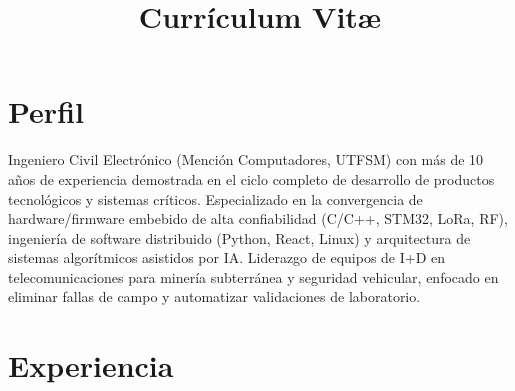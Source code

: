 \documentclass[11pt, a4paper]{moderncv}
\title{Currículum Vit\ae}
\begin{document}
\maketitle

\section{Perfil}
Ingeniero Civil Electrónico (Mención Computadores, UTFSM) con más de 10 años de experiencia demostrada en el ciclo completo de desarrollo de productos tecnológicos y sistemas críticos. Especializado en la convergencia de hardware/firmware embebido de alta confiabilidad (C/C++, STM32, LoRa, RF), ingeniería de software distribuido (Python, React, Linux) y arquitectura de sistemas algorítmicos asistidos por IA. Liderazgo de equipos de I+D en telecomunicaciones para minería subterránea y seguridad vehicular, enfocado en eliminar fallas de campo y automatizar validaciones de laboratorio.

\section{Experiencia}
\end{document}
